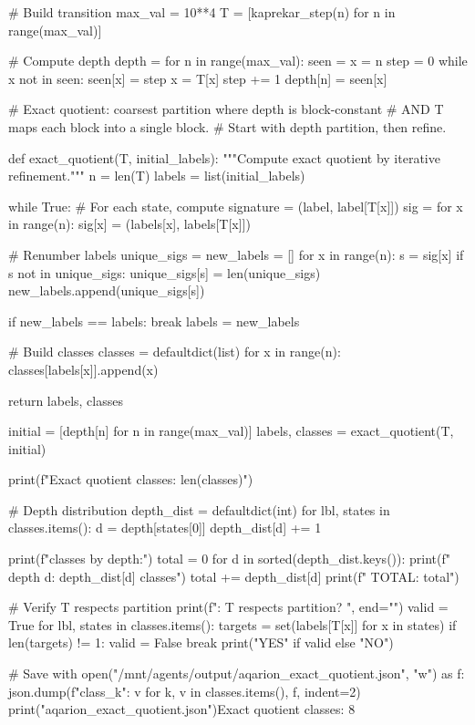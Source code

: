 {{{{{{{{{{{{{# Build transition
max_val = 10**4
T = [kaprekar_step(n) for n in range(max_val)]

# Compute depth
depth = {}
for n in range(max_val):
    seen = {}
    x = n
    step = 0
    while x not in seen:
        seen[x] = step
        x = T[x]
        step += 1
    depth[n] = seen[x]

# Exact quotient: coarsest partition where depth is block-constant
# AND T maps each block into a single block.
# Start with depth partition, then refine.

def exact_quotient(T, initial_labels):
    """Compute exact quotient by iterative refinement."""
    n = len(T)
    labels = list(initial_labels)
    
    while True:
        # For each state, compute signature = (label, label[T[x]])
        sig = {}
        for x in range(n):
            sig[x] = (labels[x], labels[T[x]])
        
        # Renumber labels
        unique_sigs = {}
        new_labels = []
        for x in range(n):
            s = sig[x]
            if s not in unique_sigs:
                unique_sigs[s] = len(unique_sigs)
            new_labels.append(unique_sigs[s])
        
        if new_labels == labels:
            break
        labels = new_labels
    
    # Build classes
    classes = defaultdict(list)
    for x in range(n):
        classes[labels[x]].append(x)
    
    return labels, classes

initial = [depth[n] for n in range(max_val)]
labels, classes = exact_quotient(T, initial)

print(f"Exact quotient classes: {len(classes)}")

# Depth distribution
depth_dist = defaultdict(int)
for lbl, states in classes.items():
    d = depth[states[0]]
    depth_dist[d] += 1

print(f"\nExact classes by depth:")
total = 0
for d in sorted(depth_dist.keys()):
    print(f"  depth {d}: {depth_dist[d]} classes")
    total += depth_dist[d]
print(f"  TOTAL: {total}")

# Verify T respects partition
print(f"\nVerification: T respects partition? ", end="")
valid = True
for lbl, states in classes.items():
    targets = set(labels[T[x]] for x in states)
    if len(targets) != 1:
        valid = False
        break
print("YES" if valid else "NO")

# Save
with open("/mnt/agents/output/aqarion_exact_quotient.json", "w") as f:
    json.dump({f"class_{k}": v for k, v in classes.items()}, f, indent=2)
print("\n[Saved] aqarion_exact_quotient.json")Exact quotient classes: 8

}}}}}}}}}}}}}

